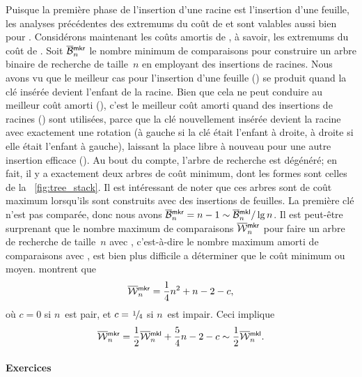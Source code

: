 Puisque la première phase de l'insertion d'une racine est l'insertion
d'une feuille, les analyses précédentes des extremums du coût de
 et  sont valables aussi bien pour
. Considérons maintenant les coûts amortis de
, à savoir, les extremums du coût de .  Soit
\(\OB{\fun{mkr}}{n}\) le nombre minimum
de comparaisons pour construire un arbre binaire de recherche de
taille~\(n\) en employant des insertions de racines. Nous avons vu que
le meilleur cas pour l'insertion d'une feuille () se
produit quand la clé insérée devient l'enfant de la racine. Bien que
cela ne peut conduire au meilleur coût amorti (), c'est le
meilleur coût amorti quand des insertions de racines ()
sont utilisées, parce que la clé nouvellement insérée devient la
racine avec exactement une rotation (à gauche si la clé était l'enfant
à droite, à droite si elle était l'enfant à gauche), laissant la place
libre à nouveau pour une autre insertion efficace (). Au
bout du compte, l'arbre de recherche est dégénéré; en fait, il y a
exactement deux arbres de coût minimum, dont les formes sont celles de
la \fig~\vref{fig:tree_stack}. Il est intéressant de noter que ces
arbres sont de coût maximum lorsqu'ils sont construits avec des
insertions de feuilles. La première clé n'est pas comparée, donc nous
avons \(\OB{\fun{mkr}}{n} = n - 1 \sim \OB{\fun{mkl}}{n}/\lg n\). Il
est peut-être surprenant que le nombre maximum de comparaisons
\(\OW{\fun{mkr}}{n}\) pour faire un
arbre de recherche de taille~\(n\) avec , c'est-à-dire le
nombre maximum amorti de comparaisons avec , est bien plus
difficile a déterminer que le coût minimum ou moyen.
\cite{GeldenhuysVanderMerwe_2009} montrent que
\begin{equation*}
\abovedisplayskip=4pt
\belowdisplayskip=4pt
\OW{\fun{mkr}}{n} = \frac{1}{4}n^2 + n - 2 - c,
\end{equation*}
où \(c = 0\) si \(n\)~est pair, et \(c=\myfrac{1}/{4}\) si
\(n\)~est impair. Ceci implique
\begin{equation*}
\abovedisplayskip=4pt
\belowdisplayskip=-8pt
\OW{\fun{mkr}}{n} = \frac{1}{2}\OW{\fun{mkl}}{n} + \frac{5}{4}n - 2 -
c \sim \frac{1}{2}\OW{\fun{mkl}}{n}.
\end{equation*}

\paragraph{Exercices}

